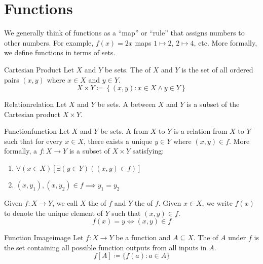 \section{Functions}
We generally think of functions as a ``map'' or ``rule'' that assigns numbers to other numbers. For example, $f(x) = 2x$ maps $1 \mapsto 2$, $2 \mapsto 4$, etc. More formally, we define functions in terms of sets.


\begin{dfnbox}{Cartesian Product}{}
    Let $X$ and $Y$ be sets. The  of $X$ and $Y$ is the set of all ordered pairs $(x,y)$ where $x \in X$ and $y \in Y$.
    \tcblower
    \[ X \times Y \coloneq \left\{ (x,y) : x \in X \land y \in Y \right\} \]
\end{dfnbox}

\begin{dfnbox}{Relation}{relation}
    Let $X$ and $Y$ be sets. A  between $X$ and $Y$ is a subset of the Cartesian product $X \times Y$.
\end{dfnbox}

\begin{dfnbox}{Function}{function}
    Let $X$ and $Y$ be sets. A  from $X$ to $Y$ is a relation from $X$ to $Y$ such that for every $x \in X$, there exists a unique $y \in Y$ where $(x,y) \in f$.
    \tcblower
    More formally, a  $f : X \to Y$ is a subset of $X \times Y$ satisfying:
    \begin{enumerate}[noitemsep]
        \item $\forall (x \in X) \left[ \exists (y \in Y)((x,y) \in f) \right]$
        \item $(x,y_1),(x,y_2) \in f \implies y_1 = y_2$
    \end{enumerate}
\end{dfnbox}


Given $f : X \to Y$, we call $X$ the  of $f$ and $Y$ the  of $f$. Given $x \in X$, we write $f(x)$ to denote the unique element of $Y$ such that $(x,y) \in f$.
\[ f(x) = y \iff (x,y) \in f \]

\begin{dfnbox}{Function Image}{image}
    Let $f : X \to Y$ be a function and $A \subseteq X$. The  of $A$ under $f$ is the set containing all possible function outputs from all inputs in $A$.
    \tcblower
    \[ f[A] \coloneq \{ f(a) : a \in A \} \]
\end{dfnbox}

